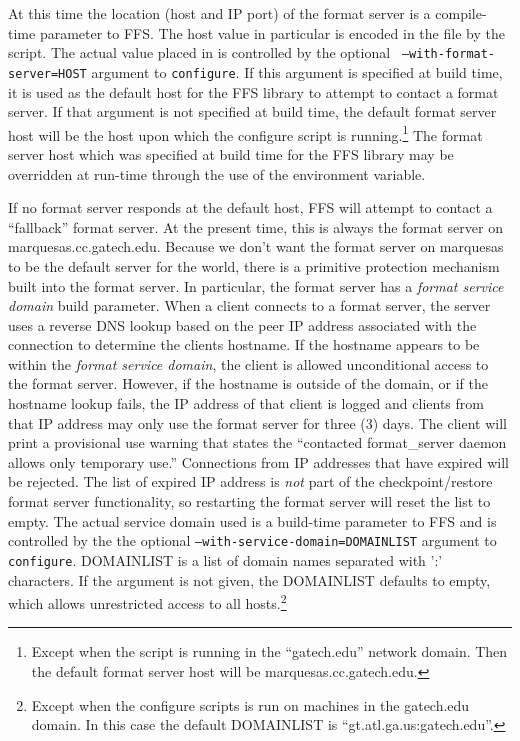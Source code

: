 At this time the location (host and IP port) of the format server is a
compile-time parameter to FFS.  The host value in particular is encoded in
the file  by the  script.  The
actual value placed in  is controlled by the optional {\tt
--with-format-server=HOST} argument to {\tt configure}.  
If this argument is specified at build time, it is used as the default host
for the FFS library to attempt to contact a format server.  If that
argument is not specified at build time, the default format server host will
be the host upon which the configure script is running.\footnote{Except when
the script is running in the ``gatech.edu'' network domain.  Then the
default format server host will be marquesas.cc.gatech.edu.}  The format
server host which was specified at build time for the FFS library may be
overridden at run-time through the use of the 
environment variable.

If no format server responds at the default host, FFS will attempt to
contact a ``fallback'' format server.  At the present time, this is always
the format server on marquesas.cc.gatech.edu.  Because we don't want the
format server on marquesas to be the default server for the world, there is
a primitive protection mechanism built into the format server.  In
particular, the format server has a {\it format service domain} build
parameter.  When a client connects to a format server, the server uses a
reverse DNS lookup based on the peer IP address associated with the
connection to determine the clients hostname.  If the hostname appears to be
within the {\it format service domain}, the client is allowed unconditional
access to the format server.  However, if the hostname is outside of the
domain, or if the hostname lookup fails, the IP address of that client is
logged and clients from that IP address may only use the format server for
three (3) days.  The client will print a provisional use warning that states
the ``contacted format\_server daemon allows only temporary
use.''  Connections from IP addresses
that have expired will be rejected.  The list of expired IP address is 
{\it not} part of the checkpoint/restore format server functionality, so
restarting the format server will reset the list to empty.  The actual
service domain used is a build-time parameter to FFS and is controlled by
the the optional {\tt --with-service-domain=DOMAINLIST} argument to {\tt
configure}.  DOMAINLIST is a list of
domain names separated with ':' characters.  If the argument is not given,
the DOMAINLIST defaults to empty, which allows unrestricted access to all
hosts.\footnote{Except when the configure scripts is run on machines in the
gatech.edu domain.  In this case the default DOMAINLIST is
``gt.atl.ga.us:gatech.edu''.} 


